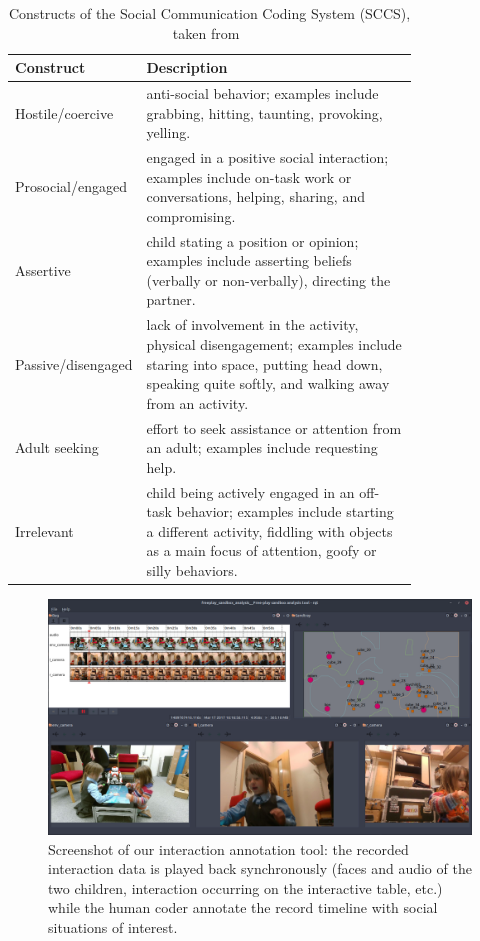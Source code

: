 \documentclass{article}
\begin{document}
\begin{table}[]
\centering
\caption{Constructs of the Social Communication Coding System (SCCS), taken from~\cite{olswang2006reliability}}
\label{table|sccs}
\renewcommand{\arraystretch}{1.8}
\begin{tabular}{@{}lp{0.8\linewidth}@{}}
\toprule
\bf Construct          & \bf Description                                                                                                                                                                                                                                                                                                                                           \\ \midrule
Hostile/coercive   & anti-social behavior; examples include grabbing, hitting, taunting, provoking, yelling.                                                       \\
Prosocial/engaged  & engaged in a positive social interaction; examples include on-task work or conversations, helping, sharing, and compromising.                 \\
Assertive          & child stating a position or opinion; examples include asserting beliefs (verbally or non-verbally), directing the partner.                     \\
Passive/disengaged & lack of involvement in the activity, physical disengagement; examples include staring into space, putting head down, speaking quite softly, and walking away from an activity.\\
Adult seeking      & effort to seek assistance or attention from an adult; examples include requesting help.                                                       \\
Irrelevant         & child being actively engaged in an off-task behavior; examples include starting a different activity, fiddling with objects as a main focus of attention, goofy or silly behaviors. \\ \bottomrule
\end{tabular}
\end{table}



\begin{figure}[b!]
    \centering
    \includegraphics[width=0.8\linewidth]{analysis}
    \caption{Screenshot of our interaction annotation tool: the recorded interaction data
    is played back synchronously (faces and audio of the two children,
    interaction occurring on the interactive table, etc.) while the human coder
    annotate the record timeline with social situations of interest.}
    \label{fig|analysis}
\end{figure}
\end{document}

